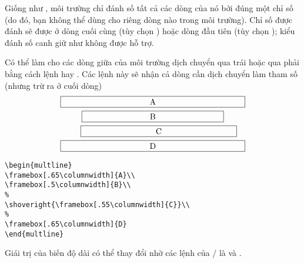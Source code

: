\documentclass[11pt,leqno,titlepage,openany]{amsldoc}[1999/12/13]
\begin{document}
\medskip
Giống như , môi trường  chỉ đánh số tất cả
các dòng của nó bởi đúng một chỉ số (do đó, bạn không thể dùng 
cho riêng dòng nào trong môi trường). Chỉ số được đánh sẽ được ở dòng
cuối cùng (tùy chọn ) hoặc dòng đầu tiên (tùy chọn );
kiểu đánh số canh giữ như  không được hỗ trợ.

\medskip
Có thể làm cho các dòng giữa của môi trường dịch chuyển qua trái hoặc
qua phải bằng cách lệnh  hay .
Các lệnh này sẽ nhận cả dòng cần dịch chuyển làm tham số
(nhưng trừ ra \cn{\\} ở cuối dòng)
\begin{multline}
\framebox[.65\columnwidth]{A}\\
\framebox[.5\columnwidth]{B}\\
\shoveright{\framebox[.55\columnwidth]{C}}\\
\framebox[.65\columnwidth]{D}
\end{multline}
\begin{verbatim}
\begin{multline}
\framebox[.65\columnwidth]{A}\\
\framebox[.5\columnwidth]{B}\\
%
\shoveright{\framebox[.55\columnwidth]{C}}\\
%
\framebox[.65\columnwidth]{D}
\end{multline}
\end{verbatim}

Giái trị của biến độ dài  có thể thay đổi nhờ các
lệnh của \latex/ là  và .

\end{document}
